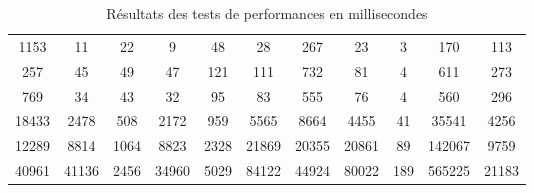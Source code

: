 \documentclass{article}
\theoremstyle{definition}
\theoremstyle{remark}
\begin{document}
\begin{landscape}
\begin{table}[!ht]
\begin{tabular}{c|c|c|c|c|c|c|c|c|c|c}
        1153 & 11 & 22 & 9 & 48 & 28 & 267 & 23 & 3 & 170 & 113 \\ 
        257 & 45 & 49 & 47 & 121 & 111 & 732 & 81 & 4 & 611 & 273 \\ 
        769 & 34 & 43 & 32 & 95 & 83 & 555 & 76 & 4 & 560 & 296 \\ 
        18433 & 2478 & 508 & 2172 & 959 & 5565 & 8664 & 4455 & 41 & 35541 & 4256 \\ 
        12289 & 8814 & 1064 & 8823 & 2328 & 21869 & 20355 & 20861 & 89 & 142067 & 9759 \\ 
        40961 & 41136 & 2456 & 34960 & 5029 & 84122 & 44924 & 80022 & 189 & 565225 & 21183 \\ 
    \end{tabular}
    \caption{Résultats des tests de performances en millisecondes}
    \label{res}
\end{table}

\end{landscape}
\restoregeometry



\end{document}
